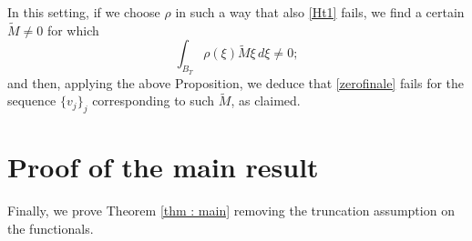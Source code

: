 \documentclass{article}
\theoremstyle{definition}
\begin{document}
In this setting, if we choose $\rho$ in such a way that also \eqref{Ht1} fails, we find a certain $\widetilde{M}\neq 0$ for which
\begin{equation*}
    \int_{B_T} \rho(\xi)\widetilde{M}\xi\,d\xi\neq0;
\end{equation*}
and then, applying the above Proposition, we deduce that 
\eqref{zerofinale} fails for the sequence $\{v_j\}_j$ corresponding to such $\widetilde{M}$, as claimed.

\section{Proof of the main result}

Finally, we prove Theorem \ref{thm : main} removing the truncation assumption on the functionals.
\end{document}
